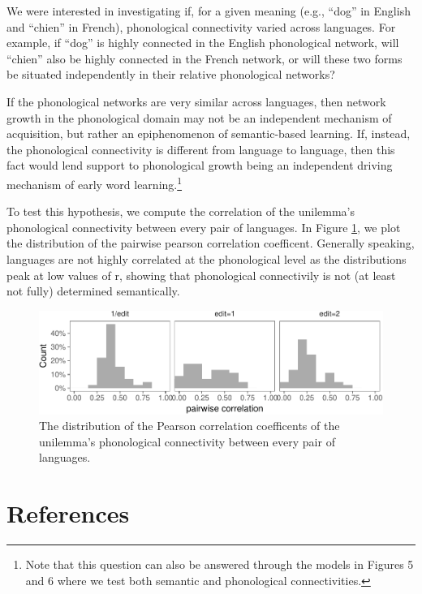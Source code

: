 \documentclass[english,floatsintext,man]{apa6}
\theoremstyle{definition}
\theoremstyle{definition}
\theoremstyle{definition}
\theoremstyle{remark}
\begin{document}
We were interested in investigating if, for a given meaning (e.g.,
\enquote{dog} in English and \enquote{chien} in French), phonological
connectivity varied across languages. For example, if \enquote{dog} is
highly connected in the English phonological network, will
\enquote{chien} also be highly connected in the French network, or will
these two forms be situated independently in their relative phonological
networks?

If the phonological networks are very similar across languages, then
network growth in the phonological domain may not be an independent
mechanism of acquisition, but rather an epiphenomenon of semantic-based
learning. If, instead, the phonological connectivity is different from
language to language, then this fact would lend support to phonological
growth being an independent driving mechanism of early word
learning.\footnote{Note that this question can also be answered through
  the models in Figures 5 and 6 where we test both semantic and
  phonological connectivities.}

To test this hypothesis, we compute the correlation of the unilemma's
phonological connectivity between every pair of languages. In Figure
\ref{fig:corrPair}, we plot the distribution of the pairwise pearson
correlation coefficent. Generally speaking, languages are not highly
correlated at the phonological level as the distributions peak at low
values of r, showing that phonological connectivily is not (at least not
fully) determined semantically.

\begin{figure}[!h]
\includegraphics[width=\textwidth]{ms_files/figure-latex/corrPair-1} \caption{The distribution of the Pearson correlation coefficents of the unilemma's phonological connectivity between every pair of languages.}\label{fig:corrPair}
\end{figure}

\newpage 

\section{References}\label{references}
\end{document}

